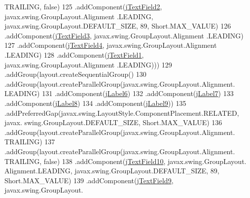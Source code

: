 \begin{DoxyCode}
      TRAILING, \textcolor{keyword}{false})
125                                     .addComponent(\mbox{\hyperlink{class_interfaz_package_1_1_alta_diccionario_ad64c1145064a7b09a9bc29cf43974b70}{jTextField2}}, javax.swing.GroupLayout.Alignment
      .LEADING, javax.swing.GroupLayout.DEFAULT\_SIZE, 89, Short.MAX\_VALUE)
126                                     .addComponent(\mbox{\hyperlink{class_interfaz_package_1_1_alta_diccionario_aae93f196d81a8be5120cd2e4a3968176}{jTextField3}}, javax.swing.GroupLayout.Alignment
      .LEADING)
127                                     .addComponent(\mbox{\hyperlink{class_interfaz_package_1_1_alta_diccionario_a66e68fc19055b7af4fcac12091ab7c45}{jTextField4}}, javax.swing.GroupLayout.Alignment
      .LEADING)
128                                     .addComponent(\mbox{\hyperlink{class_interfaz_package_1_1_alta_diccionario_a36c60a7c341675a6d9588408d4babd4c}{jTextField1}}, javax.swing.GroupLayout.Alignment
      .LEADING)))
129                             .addGroup(layout.createSequentialGroup()
130                                 .addGroup(layout.createParallelGroup(javax.swing.GroupLayout.Alignment.
      LEADING)
131                                     .addComponent(\mbox{\hyperlink{class_interfaz_package_1_1_alta_diccionario_a0c561754fd465af966a7cc6a1bc44e0b}{jLabel6}})
132                                     .addComponent(\mbox{\hyperlink{class_interfaz_package_1_1_alta_diccionario_a6b9331f8fb5ef9724ed7f357a9161928}{jLabel7}})
133                                     .addComponent(\mbox{\hyperlink{class_interfaz_package_1_1_alta_diccionario_a11b6f4d3aa1422c2bf0b283f64e86c29}{jLabel8}})
134                                     .addComponent(\mbox{\hyperlink{class_interfaz_package_1_1_alta_diccionario_a1292835cd1c494573c6e62a250c99f55}{jLabel9}}))
135                                 .addPreferredGap(javax.swing.LayoutStyle.ComponentPlacement.RELATED, javax.
      swing.GroupLayout.DEFAULT\_SIZE, Short.MAX\_VALUE)
136                                 .addGroup(layout.createParallelGroup(javax.swing.GroupLayout.Alignment.
      TRAILING)
137                                     .addGroup(layout.createParallelGroup(javax.swing.GroupLayout.Alignment.
      TRAILING, \textcolor{keyword}{false})
138                                         .addComponent(\mbox{\hyperlink{class_interfaz_package_1_1_alta_diccionario_a4fb32d82093d4c678abb7a5130e2cf23}{jTextField10}}, javax.swing.GroupLayout.
      Alignment.LEADING, javax.swing.GroupLayout.DEFAULT\_SIZE, 89, Short.MAX\_VALUE)
139                                         .addComponent(\mbox{\hyperlink{class_interfaz_package_1_1_alta_diccionario_a06c739f8e895e3be23782b6220a1bd91}{jTextField9}}, javax.swing.GroupLayout.

\end{DoxyCode}
